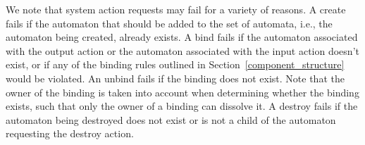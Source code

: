 We note that system action requests may fail for a variety of reasons.
A create fails if the automaton that should be added to the set of automata, i.e., the automaton being created, already exists.
A bind fails if the automaton associated with the output action or the automaton associated with the input action doesn't exist, or if any of the binding rules outlined in Section~\ref{component_structure} would be violated.
An unbind fails if the binding does not exist.
Note that the owner of the binding is taken into account when determining whether the binding exists, such that only the owner of a binding can dissolve it.
A destroy fails if the automaton being destroyed does not exist or is not a child of the automaton requesting the destroy action.

